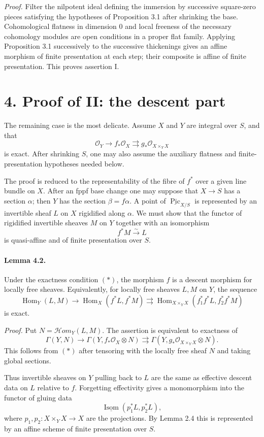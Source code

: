 \documentclass[12pt]{article}
\newcommand{\cO}{\mathcal O}
\newcommand{\Pic}{\operatorname{Pic}}
\newcommand{\Hom}{\operatorname{Hom}}
\newcommand{\Isom}{\operatorname{Isom}}
\newcommand{\longto}{\longrightarrow}
\newcommand{\iso}{\xrightarrow{\sim}}
\begin{document}
\emph{Proof.}
Filter the nilpotent ideal defining the immersion by successive square-zero pieces satisfying the hypotheses of Proposition 3.1 after shrinking the base. Cohomological flatness in dimension $0$ and local freeness of the necessary cohomology modules are open conditions in a proper flat family. Applying Proposition 3.1 successively to the successive thickenings gives an affine morphism of finite presentation at each step; their composite is affine of finite presentation. This proves assertion I.

\section*{4. Proof of II: the descent part}

The remaining case is the most delicate. Assume $X$ and $Y$ are integral over $S$, and that
\[
\cO_Y\longto f_*\cO_X\rightrightarrows g_*\cO_{X\times_YX}
\tag{$*$}
\]
is exact. After shrinking $S$, one may also assume the auxiliary flatness and finite-presentation hypotheses needed below.

The proof is reduced to the representability of the fibre of $f^*$ over a given line bundle on $X$. After an fppf base change one may suppose that $X\to S$ has a section $\alpha$; then $Y$ has the section $\beta=f\alpha$. A point of $\underline{\Pic}_{X/S}$ is represented by an invertible sheaf $L$ on $X$ rigidified along $\alpha$. We must show that the functor of rigidified invertible sheaves $M$ on $Y$ together with an isomorphism
\[
f^*M\iso L
\]
is quasi-affine and of finite presentation over $S$.

\paragraph{Lemma 4.2.}
Under the exactness condition $(*)$, the morphism $f$ is a descent morphism for locally free sheaves. Equivalently, for locally free sheaves $L,M$ on $Y$, the sequence
\[
\Hom_Y(L,M)\to\Hom_X(f^*L,f^*M)
\rightrightarrows
\Hom_{X\times_YX}(f_1^*f^*L,f_2^*f^*M)
\]
is exact.

\emph{Proof.}
Put $N=\mathcal Hom_Y(L,M)$. The assertion is equivalent to exactness of
\[
\Gamma(Y,N)\to\Gamma(Y,f_*\cO_X\otimes N)
\rightrightarrows
\Gamma(Y,g_*\cO_{X\times_YX}\otimes N).
\]
This follows from $(*)$ after tensoring with the locally free sheaf $N$ and taking global sections.

Thus invertible sheaves on $Y$ pulling back to $L$ are the same as effective descent data on $L$ relative to $f$. Forgetting effectivity gives a monomorphism into the functor of gluing data
\[
\underline{\Isom}(p_1^*L,p_2^*L),
\]
where $p_1,p_2:X\times_YX\to X$ are the projections. By Lemma 2.4 this is represented by an affine scheme of finite presentation over $S$.
\end{document}
